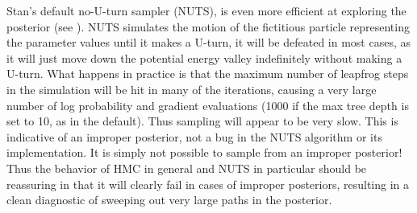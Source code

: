 Stan's default no-U-turn sampler (NUTS), is even more efficient at
exploring the posterior (see
\citep{Hoffman-Gelman:2011,Hoffman-Gelman:2014}).  NUTS simulates the
motion of the fictitious particle representing the parameter values
until it makes a U-turn, it will be defeated in most cases, as it will
just move down the potential energy valley indefinitely without making
a U-turn. What happens in practice is that the maximum number of
leapfrog steps in the simulation will be hit in many of the
iterations, causing a very large number of log probability and
gradient evaluations (1000 if the max tree depth is set to 10, as in
the default). Thus sampling will appear to be very slow.  This is
indicative of an improper posterior, not a bug in the NUTS algorithm
or its implementation.  It is simply not possible to sample from an
improper posterior!  Thus the behavior of HMC in general and NUTS
in particular should be reassuring in that it will clearly fail in
cases of improper posteriors, resulting in a clean diagnostic of
sweeping out very large paths in the posterior.  

